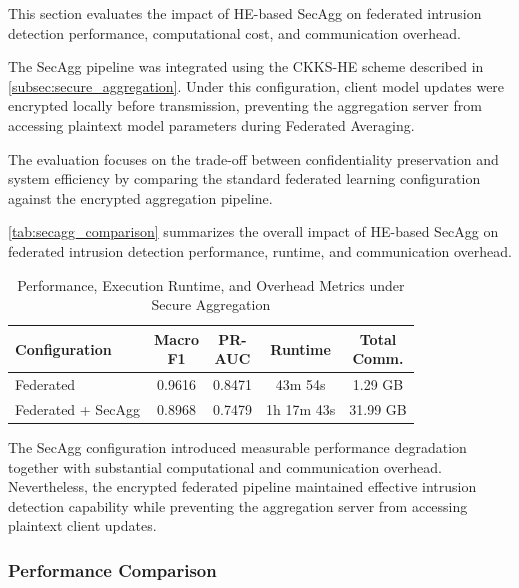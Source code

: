 \documentclass[conference]{IEEEtran}
\begin{document}
This section evaluates the impact of HE-based SecAgg on federated intrusion detection performance, computational cost, and communication overhead.

The SecAgg pipeline was integrated using the CKKS-HE scheme described in \autoref{subsec:secure_aggregation}. Under this configuration, client model updates were encrypted locally before transmission, preventing the aggregation server from accessing plaintext model parameters during Federated Averaging.

The evaluation focuses on the trade-off between confidentiality preservation and system efficiency by comparing the standard federated learning configuration against the encrypted aggregation pipeline.

\autoref{tab:secagg_comparison} summarizes the overall impact of HE-based SecAgg on federated intrusion detection performance, runtime, and communication overhead.

\begin{table}[ht]
    \centering
    \renewcommand{\arraystretch}{1.3}
    \begin{tabular}{|l|c|c|c|c|}
        \hline
        \textbf{Configuration} & \thead{\textbf{Macro}\\\textbf{F1}} & \thead{\textbf{PR-}\\\textbf{AUC}} & \textbf{Runtime} & \thead{\textbf{Total}\\\textbf{Comm.}} \\ \hline
        Federated & 0.9616 & 0.8471 & 43m 54s & 1.29 GB \\ \hline
        Federated + SecAgg & 0.8968 & 0.7479 & 1h 17m 43s & 31.99 GB \\ \hline
    \end{tabular}
    \caption{Performance, Execution Runtime, and Overhead Metrics under Secure Aggregation}
    \label{tab:secagg_comparison}
\end{table}

The SecAgg configuration introduced measurable performance degradation together with substantial computational and communication overhead. Nevertheless, the encrypted federated pipeline maintained effective intrusion detection capability while preventing the aggregation server from accessing plaintext client updates.

\subsubsection{Performance Comparison}
\end{document}
